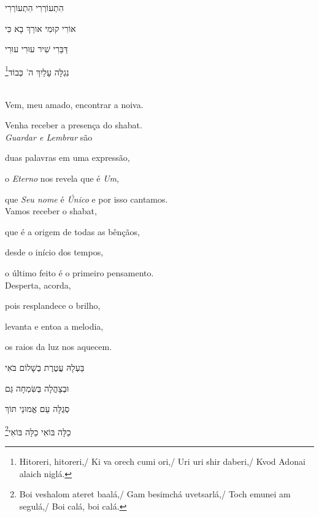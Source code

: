 הִתְעוֹרְרִי הִתְעוֹרְרִי

אוֹרִי קוּמִי אורֵךְ בָא כִּי

דַּבֵּרִי שִׁיר עוּרִי עוּרִי

נִגְלָּה עָלַיִךְ ה' כְּבוֹד\footnote{Hitoreri, hitoreri,/ Ki va orech cumi ori,/ Uri uri shir daberi,/
Kvod Adonai alaich niglá.}\\[10pt]

\movetooddpage
\raggedright

\vspace*{1cm}

\textsc{}\\[15pt]

Vem, meu amado, encontrar a noiva.

Venha receber a presença do shabat.\\[10pt]

\emph{Guardar e Lembrar} são

duas palavras em uma expressão,

o \emph{Eterno} nos revela que é \emph{Um},

que \emph{Seu nome} é \emph{Único} e por isso cantamos.\\[10pt]

Vamos receber o shabat,

que é a origem de todas as bênçãos,

desde o início dos tempos,

o último feito é o primeiro pensamento.\\[10pt]

Desperta, acorda,

pois resplandece o brilho,

levanta e entoa a melodia,

os raios da luz nos aquecem.\\[10pt]

\movetoevenpage
\raggedleft

\vspace*{1cm}

בַּעְלָהּ עֲטֶרֶת בְשָׁלוֹם בֹּאִי

וּבְצָהֳלָה בְּשִּׂמְחָה גַּם 

סְגֻלָּה עַם אֱמוּנֵי תּוֹךְ 

כַלָּה בּוֹאִי כַלָּה בּוֹאִי\footnote{
Boi veshalom ateret baalá,/ Gam besimchá uvetsarlá,/
Toch emunei am segulá,/ Boi calá, boi calá.}


\movetooddpage
\raggedright

\vspace*{1cm}

